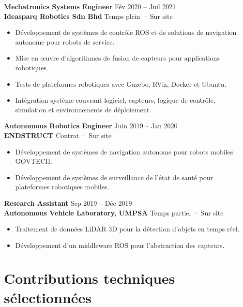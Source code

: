 \documentclass[11pt,a4paper]{article}
\begin{document}
\textbf{Mechatronics Systems Engineer} \hfill Fév 2020 -- Juil 2021\\
\textbf{Ideasparq Robotics Sdn Bhd} \hfill Temps plein · Sur site

\begin{itemize}
    \item Développement de systèmes de contrôle ROS et de solutions de navigation autonome pour robots de service.
    \item Mise en œuvre d'algorithmes de fusion de capteurs pour applications robotiques.
    \item Tests de plateformes robotiques avec Gazebo, RViz, Docker et Ubuntu.
    \item Intégration système couvrant logiciel, capteurs, logique de contrôle, simulation et environnements de déploiement.
\end{itemize}

\textbf{Autonomous Robotics Engineer} \hfill Juin 2019 -- Jan 2020\\
\textbf{ENDSTRUCT} \hfill Contrat · Sur site

\begin{itemize}
    \item Développement de systèmes de navigation autonome pour robots mobiles GOVTECH.
    \item Développement de systèmes de surveillance de l'état de santé pour plateformes robotiques mobiles.
\end{itemize}

\textbf{Research Assistant} \hfill Sep 2019 -- Déc 2019\\
\textbf{Autonomous Vehicle Laboratory, UMPSA} \hfill Temps partiel · Sur site

\begin{itemize}
    \item Traitement de données LiDAR 3D pour la détection d'objets en temps réel.
    \item Développement d'un middleware ROS pour l'abstraction des capteurs.
\end{itemize}

\section*{Contributions techniques sélectionnées}
\end{document}
